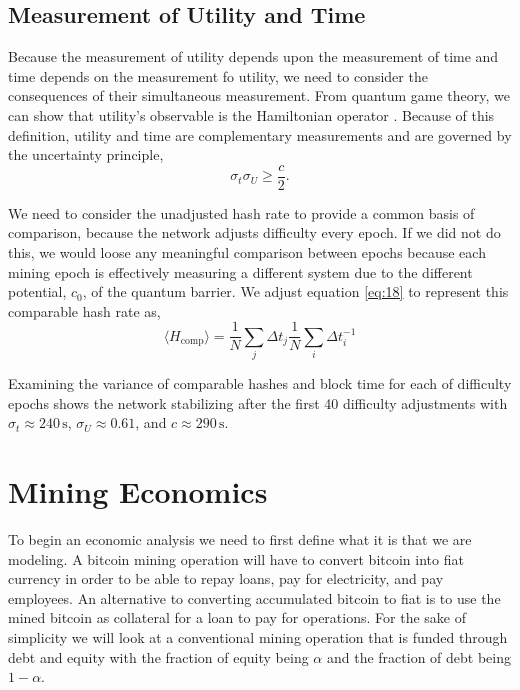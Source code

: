\documentclass[runningheads]{llncs}
\begin{document}
\subsection{Measurement of Utility and Time}\label{sect:3.3}
Because the measurement of utility depends upon the measurement of time and time depends on the measurement fo utility, we need to consider the consequences of their simultaneous measurement.
From quantum game theory, we can show that utility's observable is the Hamiltonian operator \cite{abel2021entropy}.
Because of this definition, utility and time are complementary measurements and are governed by the uncertainty principle,
\begin{equation}
    \sigma_t \sigma_U \ge \frac{c}{2}.\label{eq:17}
\end{equation}

We need to consider the unadjusted hash rate to provide a common basis of comparison, because the network adjusts difficulty every epoch.
If we did not do this, we would loose any meaningful comparison between epochs because each mining epoch is effectively measuring a different system due to the different potential, $c_0$, of the quantum barrier.
We adjust equation \ref{eq:18} to represent this comparable hash rate as,
\begin{equation}
    \langle H_{\textrm{comp}} \rangle = \frac{1}{N}\sum_j \Delta t_j \frac{1}{N} \sum_i \Delta t_i^{-1}
\end{equation}

Examining the variance of comparable hashes and block time for each of difficulty epochs shows the network stabilizing after the first 40 difficulty adjustments with $\sigma_t \approx 240 \, \textrm{s}$, $\sigma_U \approx 0.61$, and $c \approx 290\,\textrm{s}$.

\section{Mining Economics}
To begin an economic analysis we need to first define what it is that we are modeling.
A bitcoin mining operation will have to convert bitcoin into fiat currency in order to be able to repay loans, pay for electricity, and pay employees.
An alternative to converting accumulated bitcoin to fiat is to use the mined bitcoin as collateral for a loan to pay for operations.
For the sake of simplicity we will look at a conventional mining operation that is funded through debt and equity with the fraction of equity being $\alpha$ and the fraction of debt being $1 - \alpha$.
\end{document}
